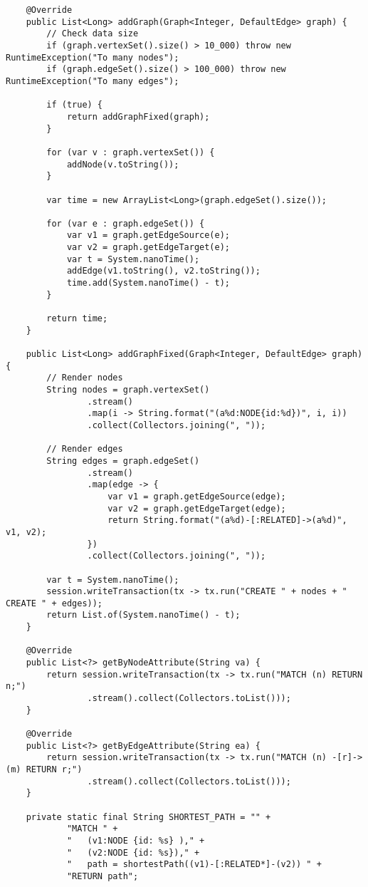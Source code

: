 \begin{lstlisting}
    @Override
    public List<Long> addGraph(Graph<Integer, DefaultEdge> graph) {
        // Check data size
        if (graph.vertexSet().size() > 10_000) throw new RuntimeException("To many nodes");
        if (graph.edgeSet().size() > 100_000) throw new RuntimeException("To many edges");

        if (true) {
            return addGraphFixed(graph);
        }

        for (var v : graph.vertexSet()) {
            addNode(v.toString());
        }

        var time = new ArrayList<Long>(graph.edgeSet().size());

        for (var e : graph.edgeSet()) {
            var v1 = graph.getEdgeSource(e);
            var v2 = graph.getEdgeTarget(e);
            var t = System.nanoTime();
            addEdge(v1.toString(), v2.toString());
            time.add(System.nanoTime() - t);
        }

        return time;
    }

    public List<Long> addGraphFixed(Graph<Integer, DefaultEdge> graph) {
        // Render nodes
        String nodes = graph.vertexSet()
                .stream()
                .map(i -> String.format("(a%d:NODE{id:%d})", i, i))
                .collect(Collectors.joining(", "));

        // Render edges
        String edges = graph.edgeSet()
                .stream()
                .map(edge -> {
                    var v1 = graph.getEdgeSource(edge);
                    var v2 = graph.getEdgeTarget(edge);
                    return String.format("(a%d)-[:RELATED]->(a%d)", v1, v2);
                })
                .collect(Collectors.joining(", "));

        var t = System.nanoTime();
        session.writeTransaction(tx -> tx.run("CREATE " + nodes + " CREATE " + edges));
        return List.of(System.nanoTime() - t);
    }

    @Override
    public List<?> getByNodeAttribute(String va) {
        return session.writeTransaction(tx -> tx.run("MATCH (n) RETURN n;")
                .stream().collect(Collectors.toList()));
    }

    @Override
    public List<?> getByEdgeAttribute(String ea) {
        return session.writeTransaction(tx -> tx.run("MATCH (n) -[r]-> (m) RETURN r;")
                .stream().collect(Collectors.toList()));
    }

    private static final String SHORTEST_PATH = "" +
            "MATCH " +
            "   (v1:NODE {id: %s} )," +
            "   (v2:NODE {id: %s})," +
            "   path = shortestPath((v1)-[:RELATED*]-(v2)) " +
            "RETURN path";


\end{lstlisting}

